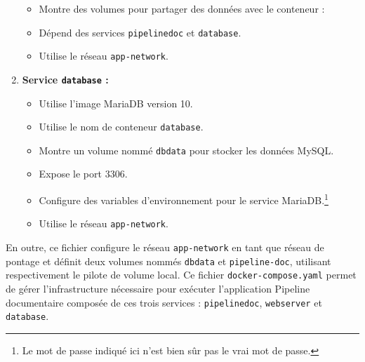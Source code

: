 \begin{enumerate}
\begin{itemize}
              \item Montre des volumes pour partager des données avec le conteneur :
              \item Dépend des services \Verb|pipelinedoc| et \Verb|database|.
              \item Utilise le réseau \Verb|app-network|.
          \end{itemize}
    \item \cprotect\textbf{Service \Verb|database| :}
          \begin{itemize}
              \item Utilise l'image MariaDB version 10.
              \item Utilise le nom de conteneur \Verb|database|.
              \item Montre un volume nommé \Verb|dbdata| pour stocker les données MySQL.
              \item Expose le port 3306.
              \item Configure des variables d'environnement pour le service MariaDB.\footnote{Le mot de passe indiqué ici n'est bien sûr pas le vrai mot de passe.}
              \item Utilise le réseau \Verb|app-network|.
          \end{itemize}
\end{enumerate}

En outre, ce fichier configure le réseau \Verb|app-network| en tant que réseau de pontage et définit deux volumes nommés \Verb|dbdata| et \Verb|pipeline-doc|, utilisant respectivement le pilote de volume local. Ce fichier \Verb|docker-compose.yaml| permet de gérer l'infrastructure nécessaire pour exécuter l'application Pipeline documentaire composée de ces trois services : \Verb|pipelinedoc|, \Verb|webserver| et \Verb|database|.

